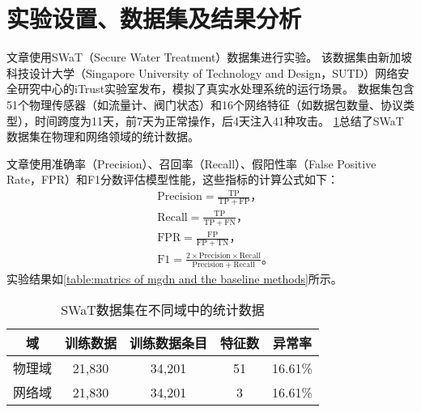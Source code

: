 \section{实验设置、数据集及结果分析}

文章使用SWaT（Secure Water Treatment）\cite{mathur2016swat}数据集进行实验。
该数据集由新加坡科技设计大学（Singapore University of Technology and Design，SUTD）网络安全研究中心的iTrust实验室发布，模拟了真实水处理系统的运行场景。
数据集包含51个物理传感器（如流量计、阀门状态）和16个网络特征（如数据包数量、协议类型），时间跨度为11天，前7天为正常操作，后4天注入41种攻击。
\cref{table:swat static info}总结了SWaT数据集在物理和网络领域的统计数据。

文章使用准确率（Precision）、召回率（Recall）、假阳性率（False Positive Rate，FPR）和F1分数评估模型性能，这些指标的计算公式如下：
\begin{align*}
    &\mathrm{Precision}=\frac{\mathrm{TP}}{\mathrm{TP}+\mathrm{FP}} \text{，} \\
    &\mathrm{Recall}=\frac{\mathrm{TP}}{\mathrm{TP}+\mathrm{FN}} \text{，} \\
    &\mathrm{FPR}=\frac{\mathrm{FP}}{\mathrm{FP}+\mathrm{TN}} \text{，} \\
    &\mathrm{F1}=\frac{2\times\mathrm{Precision}\times\mathrm{Recall}}{\mathrm{Precision}+\mathrm{Recall}} \text{。}
\end{align*}
实验结果如\cref{table:matrics of mgdn and the baseline methods}所示。

\begin{table}[ht]
    \centering
    \caption{SWaT数据集在不同域中的统计数据}
    \label{table:swat static info}
    \begin{tabular}{ccccc}
        \toprule
        \textbf{域} & \textbf{训练数据} & \textbf{训练数据条目} & \textbf{特征数} & \textbf{异常率} \\
        \midrule
        物理域 & 21,830 & 34,201 & 51 & 16.61\% \\
        网络域 & 21,830 & 34,201 & 3  & 16.61\% \\
        \bottomrule
    \end{tabular}
\end{table}

